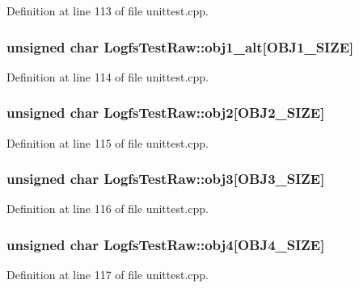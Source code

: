Definition at line 113 of file unittest.\-cpp.

\hypertarget{group___unit_tests_gab4d553b9c4a87a6f45e032b57f98a751}{
\subsubsection[{obj1\-\_\-alt}]{\setlength{\rightskip}{0pt plus 5cm}unsigned char Logfs\-Test\-Raw\-::obj1\-\_\-alt\mbox{[}O\-B\-J1\-\_\-\-S\-I\-Z\-E\mbox{]}\hspace{0.3cm}{\ttfamily [protected]}}}\label{group___unit_tests_gab4d553b9c4a87a6f45e032b57f98a751}


Definition at line 114 of file unittest.\-cpp.

\hypertarget{group___unit_tests_ga8ed143a62924cbb11a0150f51b0f39e9}{
\subsubsection[{obj2}]{\setlength{\rightskip}{0pt plus 5cm}unsigned char Logfs\-Test\-Raw\-::obj2\mbox{[}O\-B\-J2\-\_\-\-S\-I\-Z\-E\mbox{]}\hspace{0.3cm}{\ttfamily [protected]}}}\label{group___unit_tests_ga8ed143a62924cbb11a0150f51b0f39e9}


Definition at line 115 of file unittest.\-cpp.

\hypertarget{group___unit_tests_gae2971f4ef641d737044260c4f11c1ba0}{
\subsubsection[{obj3}]{\setlength{\rightskip}{0pt plus 5cm}unsigned char Logfs\-Test\-Raw\-::obj3\mbox{[}O\-B\-J3\-\_\-\-S\-I\-Z\-E\mbox{]}\hspace{0.3cm}{\ttfamily [protected]}}}\label{group___unit_tests_gae2971f4ef641d737044260c4f11c1ba0}


Definition at line 116 of file unittest.\-cpp.

\hypertarget{group___unit_tests_ga538292c7d3fd8ffe5a32cc8b7e43d51c}{
\subsubsection[{obj4}]{\setlength{\rightskip}{0pt plus 5cm}unsigned char Logfs\-Test\-Raw\-::obj4\mbox{[}O\-B\-J4\-\_\-\-S\-I\-Z\-E\mbox{]}\hspace{0.3cm}{\ttfamily [protected]}}}\label{group___unit_tests_ga538292c7d3fd8ffe5a32cc8b7e43d51c}


Definition at line 117 of file unittest.\-cpp.

